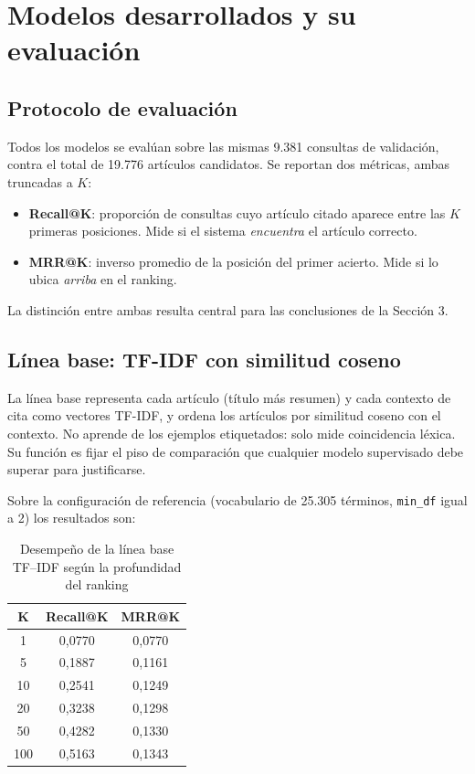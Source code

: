 \documentclass[11pt]{article}
\begin{document}
\section{Modelos desarrollados y su evaluación}

\subsection{Protocolo de evaluación}

Todos los modelos se evalúan sobre las mismas 9.381 consultas de validación, contra el total de 19.776 artículos candidatos. Se reportan dos métricas, ambas truncadas a $K$:

\begin{itemize}[leftmargin=1.4em, itemsep=1pt, topsep=2pt]
  \item \textbf{Recall@K}: proporción de consultas cuyo artículo citado aparece entre las $K$ primeras posiciones. Mide si el sistema \textit{encuentra} el artículo correcto.
  \item \textbf{MRR@K}: inverso promedio de la posición del primer acierto. Mide si lo ubica \textit{arriba} en el ranking.
\end{itemize}

La distinción entre ambas resulta central para las conclusiones de la Sección 3.

\subsection{Línea base: TF-IDF con similitud coseno}

La línea base representa cada artículo (título más resumen) y cada contexto de cita como vectores TF-IDF, y ordena los artículos por similitud coseno con el contexto. No aprende de los ejemplos etiquetados: solo mide coincidencia léxica. Su función es fijar el piso de comparación que cualquier modelo supervisado debe superar para justificarse.

Sobre la configuración de referencia (vocabulario de 25.305 términos, \texttt{min\_df} igual a 2) los resultados son:

\begin{table}[h!]
\centering
\small
\caption{Desempeño de la línea base TF--IDF según la profundidad del ranking}
\label{tab:curva}
\begin{tabular}{c c c}
\toprule
\textbf{K} & \textbf{Recall@K} & \textbf{MRR@K} \\
\midrule
1   & 0,0770 & 0,0770 \\
5   & 0,1887 & 0,1161 \\
10  & 0,2541 & 0,1249 \\
20  & 0,3238 & 0,1298 \\
50  & 0,4282 & 0,1330 \\
100 & 0,5163 & 0,1343 \\
\bottomrule
\end{tabular}
\end{table}
\end{document}
